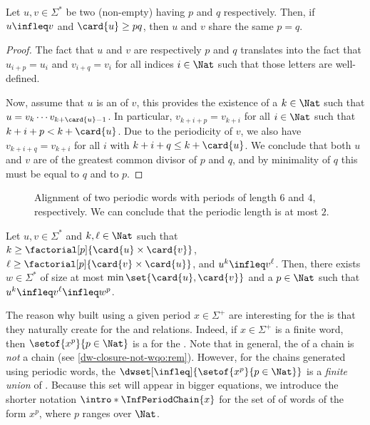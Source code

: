 \begin{lemma}
    \label{periodic-infixes:lem}
    Let $u,v \in \Sigma^*$ be two (non-empty) 
    having  $p$ and $q$ respectively.
    Then, if $u \infleq v$ and $\card{u} \geq pq$,
    then $u$ and $v$ share the same 
    $p = q$.
\end{lemma}
\begin{proof}
    The fact that $u$ and $v$ are 
    respectively $p$ and $q$ translates into the fact that $u_{i+p} = u_i$ and
    $v_{i+q} = v_i$ for all indices $i \in \Nat$ such that those letters are
    well-defined.

    Now, assume that $u$ is an  of $v$, this provides the existence
    of a $k \in \Nat$ such that $u = v_{k} \cdots v_{k + \card{u} - 1}$. In
    particular, $v_{k+i+p} = v_{k+i}$ for all $i \in \Nat$ such that $k+i+p < k
    + \card{u}$. Due to the periodicity of $v$, we also have $v_{k+i+q} = v_{k+i}$ for all $i$ with $k + i + q \leq k + \card{u}$. We conclude that both $u$ and $v$ are of
     the greatest common divisor of $p$ and $q$, and by
    minimality of $q$ this must be equal to $q$ and to $p$.
\end{proof}

\begin{figure}
	\begin{center}
		
	\end{center}
	\caption{Alignment of two periodic words with periods of length $6$ and $4$, respectively. We can conclude that the periodic length is at most $2$.}
	\label{fig:periodic-infixes}
\end{figure}


\begin{corollary}
    \label{powers-infixes:cor}
    Let $u,v \in \Sigma^*$ and $k, \ell \in \Nat$
    such that $k \geq \factorial[p]{\card{u} \times \card{v}}$,
    $\ell \geq \factorial[p]{\card{v} \times \card{u}}$,
    and $u^k \infleq v^\ell$.
    Then, there exists $w \in \Sigma^*$ of size at most
    $\min \set{\card{u}, \card{v}}$ and a $p \in \Nat$
    such that
    $u^k \infleq v^\ell \infleq w^p$.
\end{corollary}

The reason why  built using a given period $x \in \Sigma^+$
are interesting for the  is that they naturally create
 for the  and  relations. Indeed, if $x \in
\Sigma^+$ is a finite word, then $\setof{x^p}{p \in \Nat}$ is a  for
the . Note that in general, the  of a
chain is \emph{not} a chain (see \cref{dw-closure-not-wqo:rem}). However, for the chains generated using periodic
words, the  $\dwset[\infleq]{\setof{x^p}{p \in \Nat}}$ is
a \emph{finite union} of . Because this set will appear in bigger
equations, we introduce the shorter notation $\intro*\InfPeriodChain{x}$ for
the set of  of words of the form $x^p$, where $p$ ranges over
$\Nat$.


